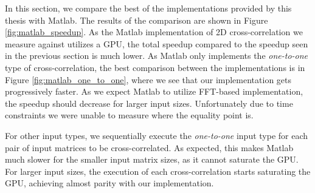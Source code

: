 In this section, we compare the best of the implementations provided by this thesis with Matlab. The results of the comparison are shown in Figure \ref{fig:matlab_speedup}. As the Matlab implementation of 2D cross-correlation we measure against utilizes a GPU, the total speedup compared to the speedup seen in the previous section is much lower. As Matlab only implements the \textit{one-to-one} type of cross-correlation, the best comparison between the implementations is in Figure \ref{fig:matlab_one_to_one}, where we see that our implementation gets progressively faster. As we expect Matlab to utilize FFT-based implementation, the speedup should decrease for larger input sizes. Unfortunately due to time constraints we were unable to measure where the equality point is.

For other input types, we sequentially execute the \textit{one-to-one} input type for each pair of input matrices to be cross-correlated. As expected, this makes Matlab much slower for the smaller input matrix sizes, as it cannot saturate the GPU. For larger input sizes, the execution of each cross-correlation starts saturating the GPU, achieving almost parity with our implementation.